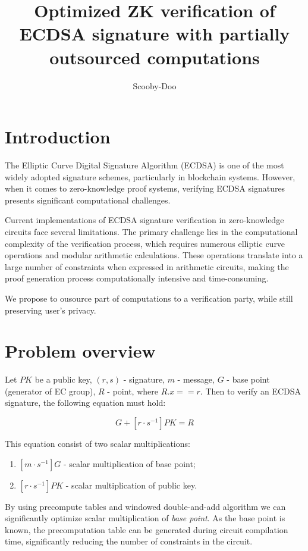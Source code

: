 \documentclass{iacrtrans}
\author{Scooby-Doo}
\institute{Distributed Lab}
\title{Optimized ZK verification of ECDSA signature with partially outsourced computations}
\begin{document}
\maketitle


\section{Introduction}
The Elliptic Curve Digital Signature Algorithm (ECDSA) is one of the most widely adopted signature schemes, particularly in blockchain systems. 
However, when it comes to zero-knowledge proof systems, verifying ECDSA signatures presents significant computational challenges.

Current implementations of ECDSA signature verification in zero-knowledge circuits face several limitations. 
The primary challenge lies in the computational complexity of the verification process, which requires numerous elliptic curve operations and modular arithmetic calculations. 
These operations translate into a large number of constraints when expressed in arithmetic circuits, making the proof generation process computationally intensive and time-consuming.

We propose to ousource part of computations to a verification party, while still preserving user's privacy.


\section{Problem overview}
Let $PK$ be a public key, $(r, s)$ - signature, $m$ - message, $G$ - base point (generator of EC group), $R$ - point, where $R.x == r$.
Then to verify an ECDSA signature, the following equation must hold:

\begin{equation}
    [m \cdot s^{-1}] G + [r \cdot s^{-1}] PK = R
\end{equation}

This equation consist of two scalar multiplications:
\begin{enumerate}
    \item $[m \cdot s^{-1}] G$ - scalar multiplication of base point;
    \item $[r \cdot s^{-1}] PK$ - scalar multiplication of public key.
\end{enumerate}

By using precompute tables and windowed double-and-add algorithm we can significantly optimize scalar multiplication of \textit{base point}.
As the base point is known, the precomputation table can be generated during circuit compilation time, significantly reducing the number 
of constraints in the circuit.
\end{document}
